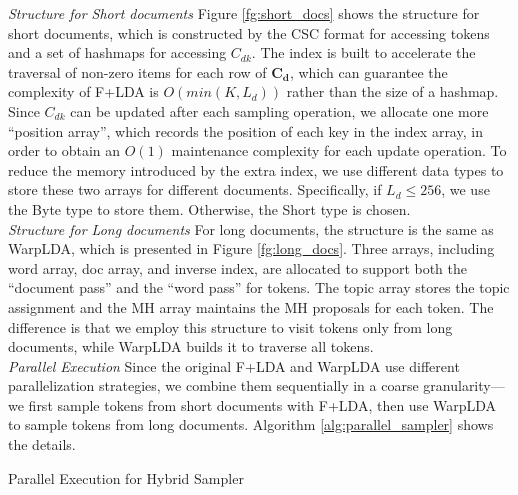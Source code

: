 \documentclass[10pt,journal,cspaper,compsoc]{IEEEtran}
\begin{document}
    \noindent
	{\large \em Structure for Short documents}
	Figure \ref{fg:short_docs} shows the structure for short documents, which is constructed by the CSC format for accessing tokens and a set of hashmaps for accessing $C_{dk}$.
	The index is built to accelerate the traversal of non-zero items for each row of $\mathbf{C_d}$,
	which can guarantee the complexity of F+LDA is $O(min(K, L_d))$ rather than the size of a hashmap.
	Since $C_{dk}$ can be updated after each sampling operation, we allocate one more ``position array'', which records the position of each key in the index array, in order to obtain an $O(1)$ maintenance complexity for each update operation.
	To reduce the memory introduced by the extra index, we use different data types to store these two arrays for different documents.
	Specifically, if $L_d \le 256$, we use the Byte type to store them.
	Otherwise, the Short type is chosen.
	\\
    
    \noindent
	{\large \em Structure for Long documents}
	For long documents, the structure is the same as WarpLDA, which is presented in Figure \ref{fg:long_docs}.
	Three arrays, including word array, doc array, and inverse index, are allocated to support both
	the ``document pass'' and the ``word pass'' for tokens.
	The topic array stores the topic assignment and the MH array maintains the MH proposals for each token.
	The difference is that we employ this structure to visit tokens only from long documents, while WarpLDA builds it to traverse all tokens.
	\\
	
	\noindent
	{\large \em Parallel Execution}
	Since the original F+LDA and WarpLDA use different parallelization strategies, we combine them sequentially in a coarse granularity---we first sample tokens from short documents with
	F+LDA, then use WarpLDA to sample tokens from long documents.
	Algorithm \ref{alg:parallel_sampler} shows the details.
	
	\begin{algorithm}[t]
		\DontPrintSemicolon
		\caption{Parallel Execution for Hybrid Sampler}
		\label{alg:parallel_sampler}
	\end{algorithm}
	
\end{document}
